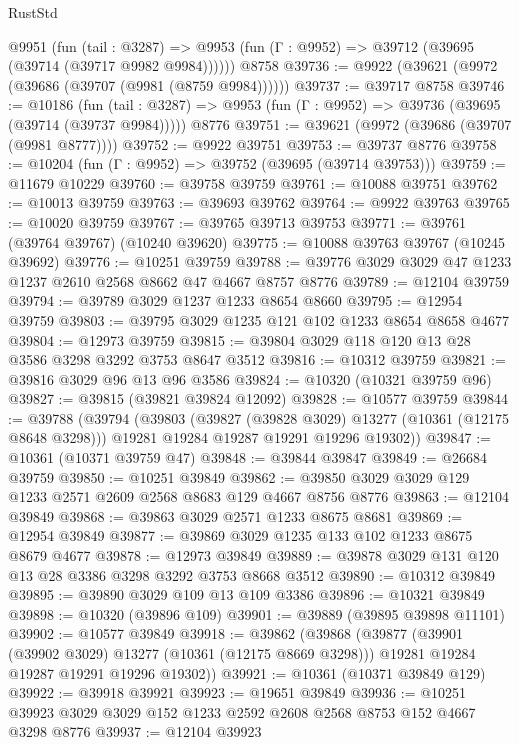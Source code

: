 \begin{lexlean}{RustStd}
\begin{coremodule}
    @9951
      (fun (tail : @3287) =>
      @9953 (fun (Γ : @9952) => @39712 (@39695 (@39714 (@39717 @9982 @9984))))))
    @8758
@39736 := @9922 (@39621 (@9972 (@39686 (@39707 (@9981 (@8759 @9984))))))
@39737 := @39717 @8758
@39746 := @10186
    (fun (tail : @3287) => @9953 (fun (Γ : @9952) => @39736 (@39695 (@39714 (@39737 @9984)))))
    @8776
@39751 := @39621 (@9972 (@39686 (@39707 (@9981 @8777))))
@39752 := @9922 @39751
@39753 := @39737 @8776
@39758 := @10204 (fun (Γ : @9952) => @39752 (@39695 (@39714 @39753)))
@39759 := @11679 @10229
@39760 := @39758 @39759
@39761 := @10088 @39751
@39762 := @10013 @39759
@39763 := @39693 @39762
@39764 := @9922 @39763
@39765 := @10020 @39759
@39767 := @39765 @39713 @39753
@39771 := @39761 (@39764 @39767) (@10240 @39620)
@39775 := @10088 @39763 @39767 (@10245 @39692)
@39776 := @10251 @39759
@39788 := @39776 @3029 @3029 @47 @1233 @1237 @2610 @2568 @8662 @47 @4667 @8757 @8776
@39789 := @12104 @39759
@39794 := @39789 @3029 @1237 @1233 @8654 @8660
@39795 := @12954 @39759
@39803 := @39795 @3029 @1235 @121 @102 @1233 @8654 @8658 @4677
@39804 := @12973 @39759
@39815 := @39804 @3029 @118 @120 @13 @28 @3586 @3298 @3292 @3753 @8647 @3512
@39816 := @10312 @39759
@39821 := @39816 @3029 @96 @13 @96 @3586
@39824 := @10320 (@10321 @39759 @96)
@39827 := @39815 (@39821 @39824 @12092)
@39828 := @10577 @39759
@39844 := @39788
    (@39794
      (@39803
        (@39827 (@39828 @3029) @13277 (@10361 (@12175 @8648 @3298)))
        @19281
        @19284
        @19287
        @19291
        @19296
        @19302))
@39847 := @10361 (@10371 @39759 @47)
@39848 := @39844 @39847
@39849 := @26684 @39759
@39850 := @10251 @39849
@39862 := @39850 @3029 @3029 @129 @1233 @2571 @2609 @2568 @8683 @129 @4667 @8756 @8776
@39863 := @12104 @39849
@39868 := @39863 @3029 @2571 @1233 @8675 @8681
@39869 := @12954 @39849
@39877 := @39869 @3029 @1235 @133 @102 @1233 @8675 @8679 @4677
@39878 := @12973 @39849
@39889 := @39878 @3029 @131 @120 @13 @28 @3386 @3298 @3292 @3753 @8668 @3512
@39890 := @10312 @39849
@39895 := @39890 @3029 @109 @13 @109 @3386
@39896 := @10321 @39849
@39898 := @10320 (@39896 @109)
@39901 := @39889 (@39895 @39898 @11101)
@39902 := @10577 @39849
@39918 := @39862
    (@39868
      (@39877
        (@39901 (@39902 @3029) @13277 (@10361 (@12175 @8669 @3298)))
        @19281
        @19284
        @19287
        @19291
        @19296
        @19302))
@39921 := @10361 (@10371 @39849 @129)
@39922 := @39918 @39921
@39923 := @19651 @39849
@39936 := @10251 @39923 @3029 @3029 @152 @1233 @2592 @2608 @2568 @8753 @152 @4667 @3298 @8776
@39937 := @12104 @39923

\end{coremodule}
\end{lexlean}
